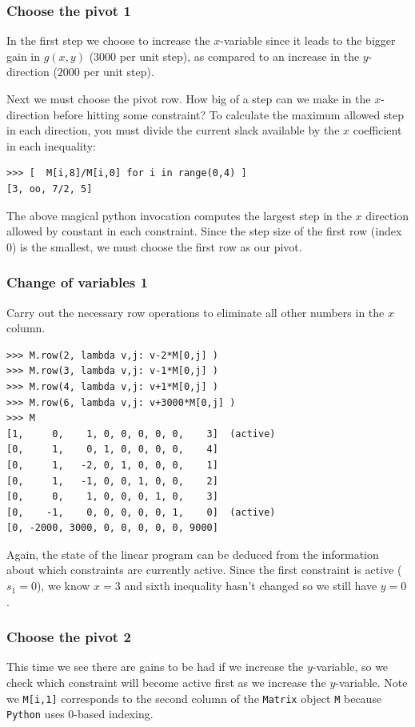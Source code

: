 \documentclass[11pt,oneside]{article}
\begin{document}
	\subsubsection{Choose the pivot 1}
	In the first step we choose to increase the $x$-variable since it leads to the bigger gain in $g(x,y)$
	($3000$ per unit step), 
	as compared to an increase in the $y$-direction ($2000$ per unit step).

	Next we must choose the pivot row.	
	How big of a step can we make in the $x$-direction before hitting some constraint?
	To calculate the maximum allowed step in each direction,
	you must divide the current slack available by the $x$ coefficient  in each inequality:
	
\begin{verbatim}
>>> [  M[i,8]/M[i,0] for i in range(0,4) ]
[3, oo, 7/2, 5]
\end{verbatim}

	\noindent
	The above magical python invocation computes the largest step in the $x$ direction allowed by constant in each constraint.
	Since the step size of the first row (index 0) is the smallest,
	we must choose the first row as our pivot.

	\subsubsection{Change of variables 1}
	Carry out the necessary row operations to eliminate all other numbers in the $x$ column.
	
\begin{verbatim}
>>> M.row(2, lambda v,j: v-2*M[0,j] )
>>> M.row(3, lambda v,j: v-1*M[0,j] )
>>> M.row(4, lambda v,j: v+1*M[0,j] )
>>> M.row(6, lambda v,j: v+3000*M[0,j] )
>>> M
[1,     0,    1, 0, 0, 0, 0, 0,    3]  (active)  
[0,     1,    0, 1, 0, 0, 0, 0,    4]
[0,     1,   -2, 0, 1, 0, 0, 0,    1]
[0,     1,   -1, 0, 0, 1, 0, 0,    2]
[0,     0,    1, 0, 0, 0, 1, 0,    3]
[0,    -1,    0, 0, 0, 0, 0, 1,    0]  (active)
[0, -2000, 3000, 0, 0, 0, 0, 0, 9000]
\end{verbatim}

	\noindent
	Again, the state of the linear program can be deduced from the information about which constraints are currently active.
	Since the first constraint is active ($s_1=0$), 
	we know $x=3$ and sixth inequality hasn't changed so we still have $y=0$.


	\subsubsection{Choose the pivot 2}
	This time we see there are gains to be had if we increase the $y$-variable,
	so we check which constraint will become active first as we increase the $y$-variable.
	Note we \texttt{M[i,1]} corresponds to the second column of the \texttt{Matrix} object \texttt{M}
	because \texttt{Python} uses $0$-based indexing.
	
\end{document}
